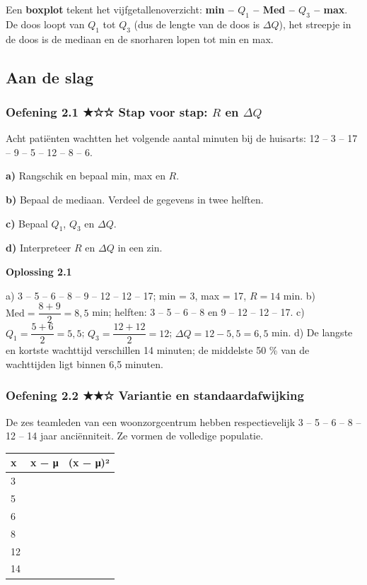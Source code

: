 \begin{theorie}
Een \textbf{boxplot} tekent het vijfgetallenoverzicht: \textbf{min – $Q_1$ – Med – $Q_3$ – max}. De doos loopt van $Q_1$ tot $Q_3$ (dus de lengte van de doos is $\Delta Q$), het streepje in de doos is de mediaan en de snorharen lopen tot min en max.
\end{theorie}

\subsection*{Aan de slag}

\subsubsection*{Oefening 2.1 \quad ★☆☆ \quad Stap voor stap: $R$ en $\Delta Q$}

Acht patiënten wachtten het volgende aantal minuten bij de huisarts: 12 – 3 – 17 – 9 – 5 – 12 – 8 – 6.

\textbf{a)} Rangschik en bepaal min, max en $R$. \lijn

\textbf{b)} Bepaal de mediaan. Verdeel de gegevens in twee helften. \lijn

\textbf{c)} Bepaal $Q_1$, $Q_3$ en $\Delta Q$. \lijn

\textbf{d)} Interpreteer $R$ en $\Delta Q$ in een zin. \lijn

\begin{oplossing}
\textbf{Oplossing 2.1}

a) 3 – 5 – 6 – 8 – 9 – 12 – 12 – 17; min = 3, max = 17, $R=14$ min. b) $\text{Med}=\dfrac{8+9}{2}=8{,}5$ min; helften: 3 – 5 – 6 – 8 en 9 – 12 – 12 – 17. c) $Q_1=\dfrac{5+6}{2}=5{,}5$; $Q_3=\dfrac{12+12}{2}=12$; $\Delta Q=12-5{,}5=6{,}5$ min. d) De langste en kortste wachttijd verschillen 14 minuten; de middelste 50 \% van de wachttijden ligt binnen 6,5 minuten.
\end{oplossing}

\subsubsection*{Oefening 2.2 \quad ★★☆ \quad Variantie en standaardafwijking}

De zes teamleden van een woonzorgcentrum hebben respectievelijk 3 – 5 – 6 – 8 – 12 – 14 jaar anciënniteit. Ze vormen de volledige populatie.

\begin{tabular}{lcc}
\hline
x & x − μ & (x − μ)² \\
\hline
3 & & \\
5 & & \\
6 & & \\
8 & & \\
12 & & \\
14 & & \\
\hline
\end{tabular}

